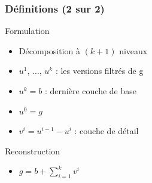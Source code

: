 \documentclass[compress]{beamer}
\begin{document}
\begin{frame}\frametitle{Définitions (2 sur 2)}
	\begin{block}{Formulation}
		\begin{itemize}
			\item Décomposition à $(k+1)$ niveaux
			\item $u^1$, $\ldots$, $u^k$ : les versions filtrés de g
			\item $u^k = b$ : dernière couche de base
			\item $u^0 = g$ 
			\item $v^i = u^{i-1} - u^i$ : couche de détail 
		\end{itemize}
	\end{block}
\pause
	\begin{block}{Reconstruction}
		\begin{itemize}
			\item $g = b + \sum_{i=1}^{k}v^i$
		\end{itemize}
	\end{block}
	
\end{frame}
\end{document}
